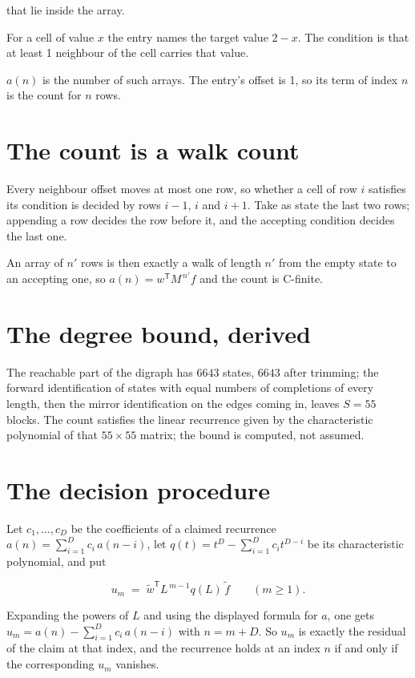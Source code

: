 \documentclass[11pt]{article}
\theoremstyle{definition}
\begin{document}
that lie inside the array.

For a cell of value $x$ the entry names the target value $2 - x$. The condition is that at least 1 neighbour of the cell carries that value.

$a(n)$ is the number of such arrays. The entry's offset is 1, so its term of index $n$ is the count for $n$ rows.

\section{The count is a walk count}

Every neighbour offset moves at most one row, so whether a cell of row $i$ satisfies its condition is decided by rows $i-1$, $i$ and $i+1$. Take as state the last two rows; appending a row decides the row before it, and the accepting condition decides the last one.

An array of $n'$ rows is then exactly a walk of length $n'$ from the empty state to an accepting one, so $a(n) = w^{\mathsf T}M^{\,n'}f$ and the count is C-finite.

\section{The degree bound, derived}

The reachable part of the digraph has $6643$ states, $6643$ after trimming; the forward identification of states with equal numbers of completions of every length, then the mirror identification on the edges coming in, leaves $S = 55$ blocks. The count satisfies the linear recurrence given by the characteristic polynomial of that $55\times55$ matrix; the bound is computed, not assumed.

\section{The decision procedure}

Let $c_1,\dots,c_D$ be the coefficients of a claimed recurrence $a(n) = \sum_{i=1}^{D} c_i\,a(n-i)$, let $q(t) = t^{D} - \sum_{i=1}^{D} c_i t^{D-i}$ be its characteristic polynomial, and put

\[u_m \;=\; \tilde w^{\mathsf T} L^{\,m-1} q(L)\,\tilde f \qquad (m \ge 1).\]

Expanding the powers of $L$ and using the displayed formula for $a$, one gets $u_m = a(n) - \sum_{i=1}^{D} c_i\,a(n-i)$ with $n = m + D$. So $u_m$ is exactly the residual of the claim at that index, and the recurrence holds at an index $n$ if and only if the corresponding $u_m$ vanishes.
\end{document}
